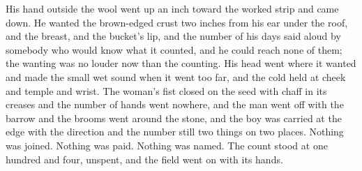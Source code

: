 His hand outside the wool went up an inch toward the worked strip and came down. He wanted the brown-edged crust two inches from his ear under the roof, and the breast, and the bucket's lip, and the number of his days said aloud by somebody who would know what it counted, and he could reach none of them; the wanting was no louder now than the counting. His head went where it wanted and made the small wet sound when it went too far, and the cold held at cheek and temple and wrist. The woman's fist closed on the seed with chaff in its creases and the number of hands went nowhere, and the man went off with the barrow and the brooms went around the stone, and the boy was carried at the edge with the direction and the number still two things on two places. Nothing was joined. Nothing was paid. Nothing was named. The count stood at one hundred and four, unspent, and the field went on with its hands.
